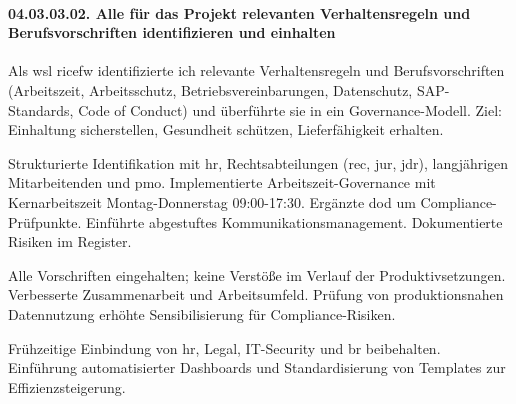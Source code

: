 \paragraph*{04.03.03.02. Alle für das Projekt relevanten Verhaltensregeln und Berufsvorschriften identifizieren und einhalten}
\label{para:04.03.03.02_VerhaltensregelnUndBerufsvorschriften}


\par Als \gls{wsl} \gls{ricefw} identifizierte ich relevante Verhaltensregeln und Berufsvorschriften (Arbeitszeit, Arbeitsschutz, Betriebsvereinbarungen, Datenschutz, SAP-Standards, Code of Conduct) und überführte sie in ein Governance-Modell. Ziel: Einhaltung sicherstellen, Gesundheit schützen, Lieferfähigkeit erhalten.

\par Strukturierte Identifikation mit \gls{hr}, Rechtsabteilungen (\gls{rec}, \gls{jur}, \gls{jdr}), langjährigen Mitarbeitenden und \gls{pmo}. Implementierte Arbeitszeit-Governance mit Kernarbeitszeit Montag-Donnerstag 09:00-17:30. Ergänzte \gls{dod} um Compliance-Prüfpunkte. Einführte abgestuftes Kommunikationsmanagement. Dokumentierte Risiken im Register.

\par Alle Vorschriften eingehalten; keine Verstöße im Verlauf der Produktivsetzungen. Verbesserte Zusammenarbeit und Arbeitsumfeld. Prüfung von produktionsnahen Datennutzung erhöhte Sensibilisierung für Compliance-Risiken.

\par Frühzeitige Einbindung von \gls{hr}, Legal, IT-Security und \gls{br} beibehalten. Einführung automatisierter Dashboards und Standardisierung von Templates zur Effizienzsteigerung.

